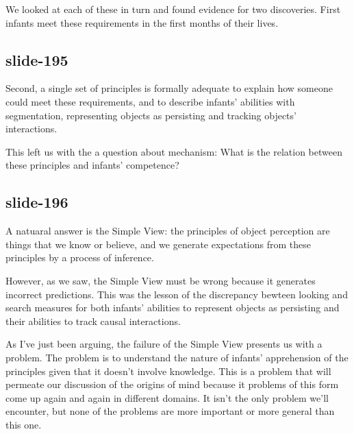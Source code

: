 \documentclass[12pt,\papersize]{extarticle}
\begin{document}
We looked at each of these in turn and found evidence for two discoveries.
First infants meet these requirements in the first months of their lives.
 
\subsection{slide-195}
Second, a single set of principles is formally adequate to explain how someone could 
meet these requirements, and to describe infants' abilities with segmentation, 
representing objects as persisting and tracking objects' interactions.
 
This left us with the a question about mechanism: What is the relation between these principles
and infants' competence?
 
\subsection{slide-196}
A natuaral answer is the Simple View: the principles of object perception are things that we know or believe, and we generate expectations from these principles by a process of inference.
 
However, as we saw, the Simple View must be wrong because it generates incorrect predictions.
This was the lesson of the discrepancy bewteen looking and search measures for both 
infants' abilities to represent objects as persisting and their abilities to track causal 
interactions.
 
As I've just been arguing, the failure of the Simple View presents us with a problem.
The problem is to understand the nature of infants' apprehension of the principles given
that it doesn't involve knowledge.
This is a problem that will permeate our discussion of the origins of mind because it 
problems of this form come up again and again in different domains. 
It isn't the only problem we'll encounter, but none of the problems are more important or more
general than this one.
 




 






\end{document}
